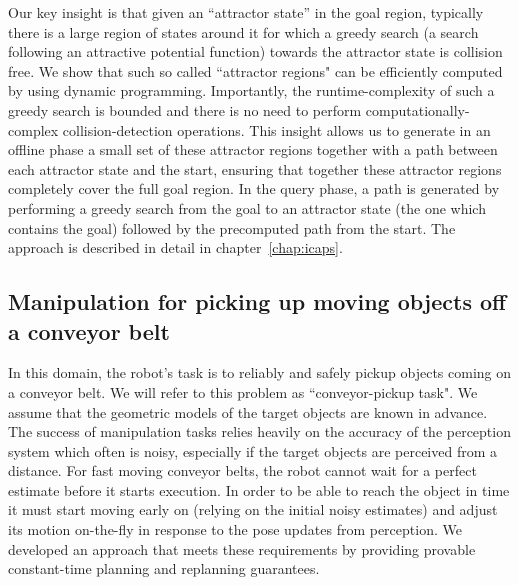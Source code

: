 \documentclass[a4paper]{report}
\begin{document}
Our key insight is that given an ``attractor state'' in the goal region, typically there is a large region of states around it for which a greedy search (a search following an attractive potential function) towards the attractor state is collision free. We show that such so called ``attractor regions" can be efficiently computed by using dynamic programming.
Importantly, the runtime-complexity of such a greedy search is bounded and there is no need to perform computationally-complex collision-detection operations. 
This insight allows us to generate in an offline phase a small set of these attractor regions together with a path between each attractor state and the start, ensuring that together these attractor regions completely cover the full goal region.
In the query phase, a path is generated by performing a greedy search from the goal to an attractor state (the one which contains the goal) followed by the precomputed path from the start. The approach is described in detail in chapter~\ref{chap:icaps}.

\subsection{Manipulation for picking up moving objects off a conveyor belt}
In this domain, the robot's task is to reliably and safely pickup objects coming on a conveyor belt. We will refer to this problem as ``conveyor-pickup task". We assume that the geometric models of the target objects are known in advance. The success of manipulation tasks relies heavily on the accuracy of the perception system which often is noisy, especially if the target objects are perceived from a distance. For fast moving conveyor belts, the robot cannot wait for a perfect estimate before it starts execution. In order to be able to reach the object in time it must start moving early on (relying on the initial noisy estimates) and adjust its motion on-the-fly in response to the pose updates from perception. We developed an approach that meets these requirements by providing provable constant-time planning and replanning guarantees.
\end{document}
